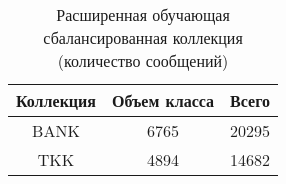 \begin{table}[ht!]
\centering
\caption{Расширенная обучающая сбалансированная коллекция (количество сообщений)}
\label{table:extendedCollection}
\begin{tabular}{|c|c|c|}
\hline
Коллекция & Объем класса & Всего \\ \hline
BANK      & 6765         & 20295 \\ \hline
TKK       & 4894         & 14682 \\ \hline
\end{tabular}
\end{table}
